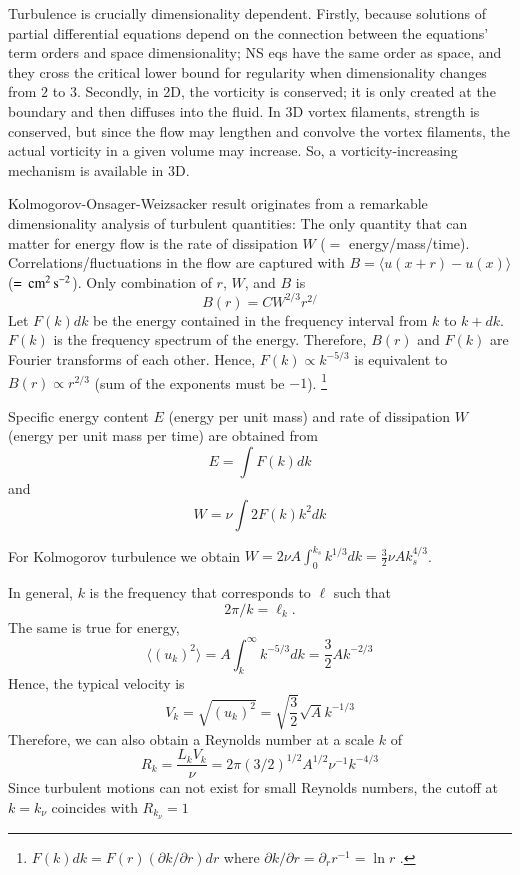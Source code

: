 \documentclass[usenatbib,twocolumn, twocolappendix]{aastex63}
\begin{document}
\begin{appendix}
Turbulence is crucially dimensionality dependent.
Firstly, because solutions of partial differential equations depend on the connection between the equations' term orders and space dimensionality;
NS eqs have the same order as space, and they cross the critical lower bound for regularity when dimensionality changes from $2$ to $3$.
Secondly, in 2D, the vorticity is conserved; it is only created at the boundary and then diffuses into the fluid.
In 3D vortex filaments, strength is conserved, but since the flow may lengthen and convolve the vortex filaments, the actual vorticity in a given volume may increase.
So, a vorticity-increasing mechanism is available in 3D.

Kolmogorov-Onsager-Weizsacker result originates from a remarkable dimensionality analysis of turbulent quantities:
The only quantity that can matter for energy flow is the rate of dissipation $W$ ($=$ energy/mass/time).
Correlations/fluctuations in the flow are captured with $B = \langle u(x+r) - u(x) \rangle$ ($= \, \mathrm{cm}^2 \, \mathrm{s}^{-2}$).
Only combination of $r$, $W$, and $B$ is 
\begin{equation}
    B(r) = C W^{2/3} r^{2/}
\end{equation}
Let $F(k)dk$ be the energy contained in the frequency interval from $k$ to $k+dk$.
$F(k)$ is the frequency spectrum of the energy.
Therefore, $B(r)$ and $F(k)$ are Fourier transforms of each other.
Hence, $F(k) \propto k^{-5/3}$ is equivalent to $B(r) \propto r^{2/3}$ (sum of the exponents must be $-1$).
\footnote{
    $F(k) dk = F(r) (\partial k/\partial r) dr$ where $\partial k/\partial r = \partial_r r^{-1} = \ln r$ .
}

Specific energy content $E$ (energy per unit mass) and rate of dissipation $W$ (energy per unit mass per time) are obtained from
\begin{equation}
    E = \int F(k) dk
\end{equation}
and
\begin{equation}
    W = \nu \int 2 F(k) k^2 dk
\end{equation}

For Kolmogorov turbulence we obtain $W = 2 \nu A \int_0^{k_s} k^{1/3} dk = \frac{3}{2} \nu A k_s^{4/3}$.

In general, $k$ is the frequency that corresponds to $\ell$ such that 
\begin{equation}
2\pi/k = \ell_k.
\end{equation}
The same is true for energy, 
\begin{equation}
    \langle (u_k)^2 \rangle = A \int_k^\infty k^{-5/3} dk = \frac{3}{2} A k^{-2/3}
\end{equation}
Hence, the typical velocity is
\begin{equation}
    V_k = \sqrt{(u_k)^2} = \sqrt{\frac{3}{2}} \sqrt{A} k^{-1/3}
\end{equation}
Therefore, we can also obtain a Reynolds number at a scale $k$ of
\begin{equation}
    R_k = \frac{L_k V_k}{\nu} = 2\pi (3/2)^{1/2} A^{1/2} \nu^{-1} k^{-4/3}
\end{equation}
Since turbulent motions can not exist for small Reynolds numbers, the cutoff at $k = k_\nu$ coincides with $R_{k_\nu} = 1$


\end{appendix}
\end{document}
